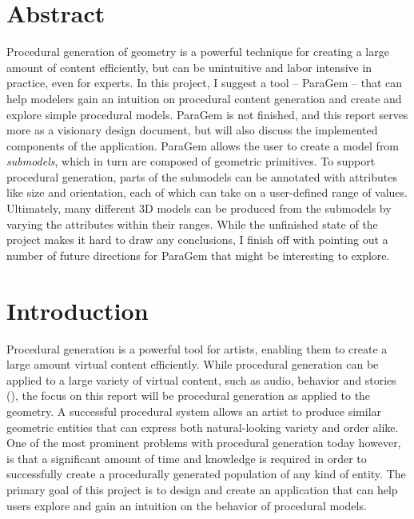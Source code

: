 \documentclass[english]{article}
\begin{document}
\iffalse
\title{ParaGem - An Intuitive Tool for Creating Procedural Geometry}

\author{Håkon Flatval}

\maketitle
\fi


\pagebreak


\thispagestyle{fancy}


\section{Abstract}
Procedural generation of geometry is a powerful technique for creating a large amount of content efficiently, but can be unintuitive and labor intensive in practice, even for experts. In this project, I suggest a tool -- ParaGem -- that can help modelers gain an intuition on procedural content generation and create and explore simple procedural models. ParaGem is not finished, and this report serves more as a visionary design document, but will also discuss the implemented components of the application. ParaGem allows the user to create a model from \textit{submodels}, which in turn are composed of geometric primitives. To support procedural generation, parts of the submodels can be annotated with attributes like size and orientation, each of which can take on a user-defined range of values. Ultimately, many different 3D models can be produced from the submodels by varying the attributes within their ranges. While the unfinished state of the project makes it hard to draw any conclusions, I finish off with pointing out a number of future directions for ParaGem that might be interesting to explore.
  

\pagebreak
  
\section{Introduction}

Procedural generation is a powerful tool for artists, enabling them to create a large amount virtual content efficiently. While procedural generation can be applied to a large variety of virtual content, such as audio, behavior and stories (\cite{pcg_survey_2017}), the focus on this report will be procedural generation as applied to the geometry. A successful procedural system allows an artist to produce similar geometric entities that can express both natural-looking variety and order alike. One of the most prominent problems with procedural generation today however, is that a significant amount of time and knowledge is required in order to successfully create a procedurally generated population of any kind of entity. The primary goal of this project is to design and create an application that can help users explore and gain an intuition on the behavior of procedural models.
\end{document}
